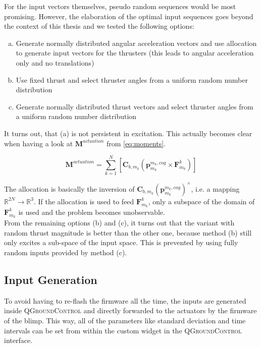 For the input vectors themselves, pseudo random sequences would be most promising.
However, the elaboration of the optimal input sequences goes beyond the context of this thesis and we tested the following options:
\begin{enumerate}[(a)]
\item Generate normally distributed angular acceleration vectors and use allocation to generate input vectors for the thrusters (this leads to angular acceleration only and no translations)
\item Use fixed thrust and select thruster angles from a uniform random number distribution
\item Generate normally distributed thrust vectors and select thruster angles from a uniform random number distribution
\end{enumerate}
It turns out, that (a) is not persistent in excitation.
This actually becomes clear when having a look at $\mathbf{M}^{actuation}$ from \cref{eq:moments}.

\begin{equation}
\label{eq:m_actuation}
\mathbf{M}^{actuation} = \sum_{k=1}^N  \left[  \mathbf{C}_{b,m_k} \left( \mathbf{p}^{m_k,cog}_{m_k} \times \mathbf{F}^k_{m_k} \right)  \right]
\end{equation}

The allocation is basically the inversion of $\mathbf{C}_{b,m_k} ( \mathbf{p}^{m_k,cog}_{m_k})^\times$, i.e. a mapping $\mathbb{R}^{2N} \rightarrow \mathbb{R}^3$.
If the allocation is used to feed $\mathbf{F}^k_{m_k}$, only a subspace of the domain of $\mathbf{F}^k_{m_k}$ is used and the problem becomes unobservable.
\\

From the remaining options (b) and (c), it turns out that the variant with random thrust magnitude is better than the other one, because method (b) still only excites a sub-space of the input space.
This is prevented by using fully random inputs provided by method (c).

\subsection{Input Generation}
\label{sub:input_generation}
To avoid having to re-flash the firmware all the time, the inputs are generated inside \textsc{QGroundControl} and directly forwarded to the actuators by the firmware of the blimp.
This way, all of the parameters like standard deviation and time intervals can be set from within the custom widget in the \textsc{QGroundControl} interface.

